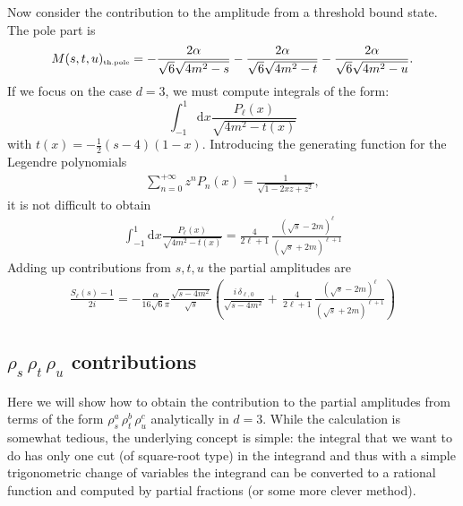 \documentclass[12pt]{article}
\newcommand{\begBvR}[1]{\begin{#1}}
\newcommand{\beq}{\begBvR{equation}}
\newcommand{\eeq}{\end{equation}}
\newcommand{\bea}{\begBvR{eqnarray}}
\newcommand{\eea}{\end{eqnarray}}
\newcommand{\ud}{\mathrm d}
\newcommand{\<}{{\langle}}
\renewcommand{\>}{{\rangle}}
\begin{document}
Now consider the contribution to the amplitude from a threshold bound state. The pole part is
\beq
M(s,t,u)_{\mbox{\tiny th.pole}}=-\frac{2\alpha}{\sqrt{6}\sqrt{4m^2-s}}-\frac{2\alpha}{\sqrt{6}\sqrt{4m^2-t}}-\frac{2\alpha}{\sqrt{6}\sqrt{4m^2-u}}.
\eeq
If we focus on the case $d=3$, we must compute integrals of the form:
\beq
\int_{-1}^1 \ud x\frac{P_{\ell}(x)}{\sqrt{4m^2-t(x)}} 
\eeq
with $t(x)=-\frac 12 (s-4)(1-x)$. Introducing the generating function for the Legendre polynomials
\bea
\sum_{n=0}^{+\infty} z^n P_n(x)=\frac{1}{\sqrt{1-2 x z+z^2}},
\eea
it is not difficult to obtain
\bea
\int_{-1}^1 \ud x \frac{ P_{\ell}(x)}{\sqrt{4m^2-t(x)}} =\frac{4}{2\ell+1}\,\frac{(\sqrt{s}-2m)^{\ell}}{(\sqrt{s}+2m)^{\ell+1}}
\eea
Adding up contributions from $s,t,u$  the partial amplitudes are
\bea
\frac{S_\ell(s)-1}{2i}=-\frac{\alpha}{16\sqrt{6}\pi}\frac{\sqrt{s-4m^2}}{\sqrt{s}}\left(\frac{i\,\delta_{\ell,0}}{\sqrt{s-4m^2}}+\,\frac{4}{2\ell+1}\,\frac{(\sqrt{s}-2m)^{\ell}}{(\sqrt{s}+2m)^{\ell+1}}\right)\label{eq:thpolewaves}
\eea


\subsection{\texorpdfstring{$\rho_s\, \rho_t\, \rho_u$}{rhos, rhot, rhou} contributions}
Here we will show how to obtain the contribution to the partial amplitudes from terms of the form $\rho_s^a\,\rho_t^b\, \rho_u^c$ analytically in $d=3$. While the calculation is somewhat tedious, the underlying concept is simple:  the integral that we want to do has only one cut (of square-root type) in the integrand and thus with a simple trigonometric change of variables the integrand can be converted to a rational function and computed by partial fractions (or some more clever method).  
\end{document}
